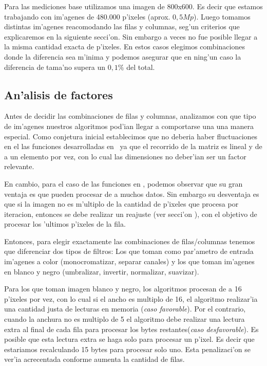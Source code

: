Para las mediciones base utilizamos una imagen de 800x600. Es decir que estamos trabajando con im'agenes de 480.000 p'ixeles (aprox. $0,5Mp$). Luego tomamos distintas im'agenes reacomodando las filas y columnas, seg'un criterios que explicaremos en la siguiente secci'on. Sin embargo a veces no fue posible llegar a la misma cantidad exacta de p'ixeles. En estos casos elegimos combinaciones donde la diferencia sea m'inima y podemos asegurar que en ning'un caso la diferencia de tama'no supera un $0,1\%$ del total.

\subsection{An'alisis de factores}
Antes de decidir las combinaciones de filas y columnas, analizamos con que tipo de im'agenes nuestros algoritmos pod'ian
llegar a comportarse una una manera especial. Como conjetura inicial establecimos que no deberia haber 
fluctuaciones en el las funciones desarrolladas en \C \ ya que el recorrido de la matriz es lineal y
de a un elemento por vez, con lo cual las dimensiones no deber'ian ser un factor relevante. 

En cambio, para el caso de las funciones en \ass, podemos observar que su gran ventaja es que pueden procesar de a muchos datos. Sin embargo su desventaja es que si la imagen no es m'ultiplo de la cantidad de p'ixeles que procesa por iteracion, entonces se debe realizar un reajuste (ver secci'on \label{sec:ciclos}), con el objetivo de procesar los 'ultimos p'ixeles de la fila.

Entonces, para elegir exactamente las combinaciones de filas/columnas tenemos que diferenciar dos tipos de
filtros: Los que toman como par'ametro de entrada im'agenes a color (monocromatizar, separar canales) y los que toman im'agenes en blanco y negro
(umbralizar, invertir, normalizar, suavizar).

Para los que toman imagen blanco y negro, los algoritmos procesan de a 16 p'ixeles por vez, con lo cual si el ancho es multiplo de 16, el algoritmo realizar'ia una cantidad justa de lecturas en memoria (\textit{caso favorable}). Por el contrario, cuando la anchura no es multiplo de 5 el algoritmo debe realizar una lectura extra al final de cada fila para procesar los bytes restantes(\textit{caso desfavorable}). Es posible que esta lectura extra se haga solo para procesar un p'ixel. Es decir que estariamos recalculando 15 bytes para procesar solo uno. Esta penalizaci'on se ver'ia acrecentada conforme aumenta la cantidad de filas.

